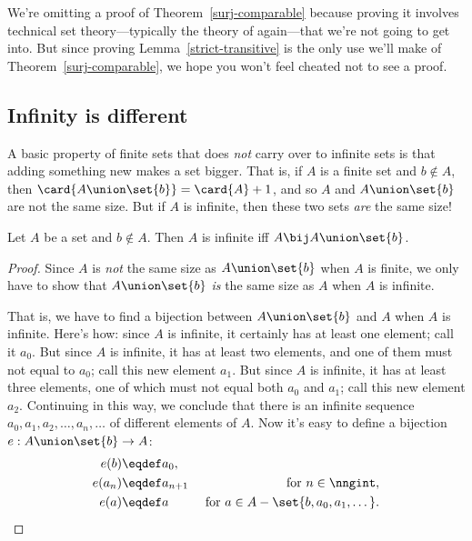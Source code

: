 We're omitting a proof of Theorem~\ref{surj-comparable} because
proving it involves technical set theory---typically the theory of
 again---that we're not going to get into.  But since
proving Lemma~\ref{strict-transitive} is the only use we'll make of
Theorem~\ref{surj-comparable}, we hope you won't feel cheated not to
see a proof.

\subsection{Infinity is different}

A basic property of finite sets that does \emph{not} carry over to
infinite sets is that adding something new makes a set bigger.  That
is, if $A$ is a finite set and $b \notin A$, then $\card{A \union
  \set{b}} = \card{A}+1$, and so $A$ and $A \union \set{b}$ are not
the same size.  But if $A$ is infinite, then these two sets \emph{are}
the same size!

\begin{lemma}\label{AUb}
  Let $A$ be a set and $b \notin A$.  Then $A$ is infinite iff $A \bij
  A \union \set{b}$.
\end{lemma}
\begin{proof}
  Since $A$ is \emph{not} the same size as $A \union \set{b}$ when $A$
  is finite, we only have to show that $A \union \set{b}$ \emph{is}
  the same size as $A$ when $A$ is infinite.

That is, we have to find a bijection between $A \union \set{b}$ and
$A$ when $A$ is infinite.  Here's how: since $A$ is infinite, it
certainly has at least one element; call it $a_0$.  But since $A$ is
infinite, it has at least two elements, and one of them must not equal
to $a_0$; call this new element $a_1$.  But since $A$ is infinite, it
has at least three elements, one of which must not equal both $a_0$
and $a_1$; call this new element $a_2$.  Continuing in this way, we
conclude that there is an infinite sequence
$a_0,a_1,a_2,\dots,a_n,\dots$ of different elements of $A$.  Now it's
easy to define a bijection $e: A \union \set{b} \to A$:
\begin{align*}
e(b) & \eqdef a_0,\\
e(a_n) & \eqdef a_{n+1}
          & \text{ for } n \in \nngint,\\
e(a) & \eqdef a
          & \text{ for } a \in A - \set{b,a_0,a_1,\dots}.
\end{align*}
\end{proof}

